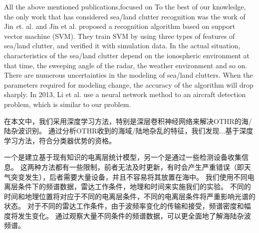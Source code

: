 All the above mentioned publications,focused on To the best of our knowledge, the only work that has considered sea/land clutter recognition was the work of Jin {\emph et. al.} \cite{jin2012svm} and Jin et al. \cite{jin2012svm} proposed a recognition algorithm based on support vector machine (SVM). They train SVM by using three types of features of sea/land clutter, and verified it with simulation data. In the actual situation, characteristics of the sea/land clutter depend on the ionospheric environment at that time, the sweeping angle of the radar, the weather environment and so on. There are numerous uncertainties in the modeling of sea/land clutters. When the parameters required for modeling change, the accuracy of the algorithm will drop sharply. In 2013, Li et al. \cite{li2013high} use a neural network method to an aircraft detection problem, which is similar to our problem.


在本文中，我们采用深度学习方法，特别是深层卷积神经网络来解决OTHR的海/陆杂波识别。 通过分析OTHR收到的海域/陆地杂乱的特征，我们发现...基于深度学习方法，符合分类器优势的资格。

一个是建立基于现有知识的电离层统计模型，另一个是通过一些检测设备收集信息。 这两种方法都有一些限制，前者无法及时更新，有时会产生严重错误（即天气突变发生），后者需要大量设备，并且不容易将其放置在海中。
我们使用不同电离层条件下的频谱数据，雷达工作条件，地理和时间来实施我们的实验。 不同的时间和地理位置将对应于不同的电离层条件，不同的电离层条件将严重影响光谱的状态。 对于不同的雷达工作条件，由于波频率变化的传输和接受，频谱密度和幅度将发生变化。 通过观察大量不同条件的频谱数据，可以更全面地了解海陆杂波频谱。
